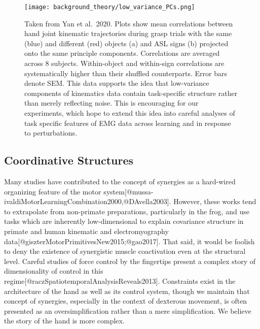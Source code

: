 \documentclass[../main.tex]{subfiles}
\begin{document}
\begin{figure}[H]
\centering
  \texttt{[image: background\_theory/low\_variance\_PCs.png]}
  \caption[Low-variance PCs contain task-relevant information]{Taken from Yan et al.~2020. Plots show mean correlations between hand joint kinematic trajectories during grasp trials with the same (blue) and different (red) objects (a) and ASL signs (b) projected onto the same principle components. Correlations are averaged across 8 subjects. Within-object and within-sign correlations are systematically higher than their shuffled counterparts. Error bars denote SEM. This data supports the idea that low-variance components of kinematics data contain task-specific structure rather than merely reflecting noise. This is encouraging for our experiments, which hope to extend this idea into careful analyses of task specific features of EMG data across learning and in response to perturbations.}\label{fig:low_variance_PCs}
\end{figure}













\subsection{Coordinative Structures}\label{coordinative-structures}

Many studies have contributed to the concept of synergies as a hard-wired organizing feature of the motor system{[}@mussa-ivaldiMotorLearningCombination2000,@DAvella2003{]}. However, these works tend to extrapolate from non-primate preparations, particularly in the frog, and use tasks which are inherently low-dimensional to explain covariance structure in primate and human kinematic and electromyography data{[}@giszterMotorPrimitivesNew2015;@gao2017{]}. That said, it would be foolish to deny the existence of synergistic muscle coactivation even at the structural level. Careful studies of force control by the fingertips present a complex story of dimensionality of control in this regime{[}@raczSpatiotemporalAnalysisReveals2013{]}. Constraints exist in the architecture of the hand as well as its control system, though we maintain that concept of synergies, especially in the context of dexterous movement, is often presented as an oversimplification rather than a mere simplification. We believe the story of the hand is more complex.
\end{document}
